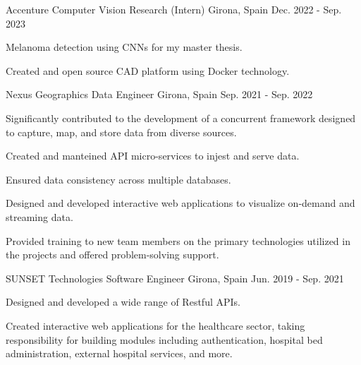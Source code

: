 \begin{cventries}
    \cventry
    {Accenture} %
    {Computer Vision Research (Intern)} %
    {Girona, Spain} %
    {Dec. 2022 - Sep. 2023} %
    {
    \begin{cvitems}
    \item{Melanoma detection using CNNs for my master thesis.}
    \item{Created and open source CAD platform using Docker technology.}
    \end{cvitems}
    }

      \cventry
      {Nexus Geographics} %
      {Data Engineer} %
      {Girona, Spain} %
      {Sep. 2021 - Sep. 2022} %
      {
        \begin{cvitems}
        \item {Significantly contributed to the development of a concurrent
          framework designed to capture, map, and store data from diverse
        sources.}
        \item {Created and manteined API micro-services to injest and serve data.}
        \item {Ensured data consistency across multiple databases.}
        \item {Designed and developed interactive web applications to visualize
          on-demand and streaming data.}
        \item {Provided training to new team members on the primary
          technologies utilized in the projects and offered problem-solving
        support.}
        \end{cvitems}
      }


      \cventry
      {SUNSET Technologies} %
      {Software Engineer} %
      {Girona, Spain} %
      {Jun. 2019 - Sep. 2021} %
      {
        \begin{cvitems}
        \item {Designed and developed a wide range of Restful APIs.}
        \item {Created interactive web applications for the healthcare sector,
          taking responsibility for building modules including authentication,
        hospital bed administration, external hospital services, and more.}
        \end{cvitems}
      }

  \end{cventries}
